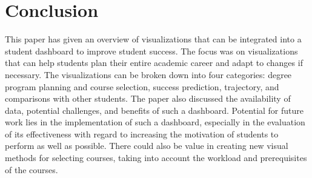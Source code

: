 \section{Conclusion}
\label{sec:conclusion}

This paper has given an overview of visualizations that can be integrated into a student dashboard to improve student success. The focus was on visualizations that can help students plan their entire academic career and adapt to changes if necessary. The visualizations can be broken down into four categories: degree program planning and course selection, success prediction, trajectory, and comparisons with other students. The paper also discussed the availability of data, potential challenges, and benefits of such a dashboard.
Potential for future work lies in the implementation of such a dashboard, especially in the evaluation of its effectiveness with regard to increasing the motivation of students to perform as well as possible. There could also be value in creating new visual methods for selecting courses, taking into account the workload and prerequisites of the courses.